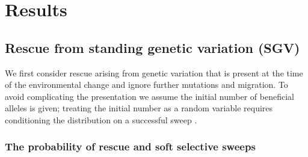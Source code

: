 \documentclass[]{article}
\begin{document}
\section*{Results}
\label{sec:results}

\subsection*{Rescue from standing genetic variation (SGV)}
\label{sec:rescue_forward_SGV}

We first consider rescue arising from genetic variation that is present at the time of the environmental change and ignore further mutations and migration.
To avoid complicating the presentation we assume the initial number of beneficial alleles is given; treating the initial number as a random variable requires conditioning the distribution on a successful sweep \citep[][]{hermisson2017soft}.

\subsubsection*{The probability of rescue and soft selective sweeps}
\end{document}

